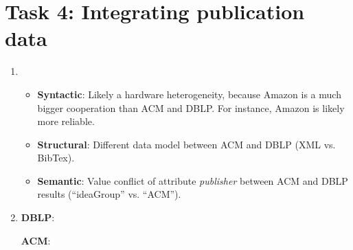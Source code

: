 \documentclass{scrartcl}
\begin{document}
	\section*{Task 4: Integrating publication data}
	\begin{enumerate}
		\item
		\begin{itemize}
			\item \textbf{Syntactic}:
			Likely a hardware heterogeneity, because Amazon is a much bigger cooperation than ACM and DBLP.
			For instance, Amazon is likely more reliable.
			\item \textbf{Structural}:
			Different data model between ACM and DBLP (XML vs. BibTex).
			\item \textbf{Semantic}:
			Value conflict of attribute \textit{publisher} between ACM and DBLP results (\enquote{ideaGroup} vs. \enquote{ACM}).
		\end{itemize}
		\newpage
		\item \textbf{DBLP}:
		\begin{center}
		\end{center}
		
		\textbf{ACM}:
		\begin{center}
		\end{center}
		

\end{enumerate}
\end{document}
